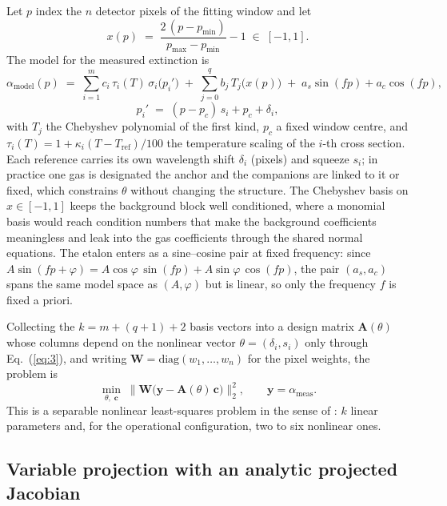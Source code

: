 Let $p$ index the $n$ detector pixels of the fitting window and let
\begin{equation*}
x(p) \;=\; \frac{2\,(p-p_{\min})}{p_{\max}-p_{\min}} - 1 \;\in\; [-1,1].
\end{equation*}
The model for the measured extinction is
\begin{equation}
\alpha_{\text{model}}(p)\;=\;
\sum_{i=1}^{m} c_i\,\tau_i(T)\,\sigma_i\bigl(p_i'\bigr)
\;+\;\sum_{j=0}^{q} b_j\,T_j\bigl(x(p)\bigr)
\;+\; a_s \sin(f p) + a_c \cos(f p),
\label{eq:2}
\end{equation}
\begin{equation}
p_i' \;=\; (p-p_c)\,s_i + p_c + \delta_i ,
\label{eq:3}
\end{equation}
with $T_j$ the Chebyshev polynomial of the first kind, $p_c$ a fixed window centre,
and $\tau_i(T)=1+\kappa_i (T-T_{\mathrm{ref}})/100$ the temperature scaling of the
$i$-th cross section. Each reference carries its own wavelength shift $\delta_i$
(pixels) and squeeze $s_i$; in practice one gas is designated the anchor and the
companions are linked to it or fixed, which constrains $\theta$ without changing the structure.
The Chebyshev basis on $x\in[-1,1]$ keeps the background block well conditioned, where a monomial basis would
reach condition numbers that make the background coefficients meaningless and leak into the gas coefficients
through the shared normal equations. The etalon enters as a sine--cosine pair at fixed frequency: since
$A\sin(fp+\varphi)=A\cos\varphi\,\sin(fp)+A\sin\varphi\,\cos(fp)$, the pair $(a_s,a_c)$ spans the same model
space as $(A,\varphi)$ but is linear, so only the frequency $f$ is fixed a priori.

Collecting the $k=m+(q+1)+2$ basis vectors into a design matrix $\mathbf{A}(\theta)$
whose columns depend on the nonlinear vector $\theta=(\delta_i,s_i)$ only through
Eq.~(\ref{eq:3}), and writing $\mathbf{W}=\mathrm{diag}(w_1,\dots,w_n)$ for the pixel weights,
the problem is
\begin{equation}
\min_{\theta,\;\mathbf{c}}\;
\bigl\|\mathbf{W}\bigl(\mathbf{y}-\mathbf{A}(\theta)\,\mathbf{c}\bigr)\bigr\|_2^2,
\qquad \mathbf{y}=\alpha_{\text{meas}} .
\label{eq:4}
\end{equation}
This is a separable nonlinear least-squares problem in the sense of \citet{Golub_1973}:
$k$ linear parameters and, for the operational configuration, two to
six nonlinear ones.

\subsection{Variable projection with an analytic projected Jacobian}
\label{sec:2.3}

